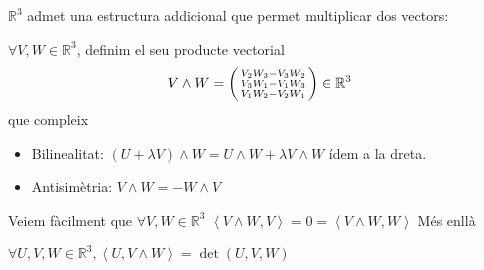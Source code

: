 \documentclass[../main.tex]{subfiles}
\begin{document}
$\mathbb{R}^3$ admet una estructura addicional que permet multiplicar dos vectors:
\begin{definicio}
    $\forall V, W \in \mathbb{R}^3$, definim el seu producte vectorial
    \begin{displaymath}
        V\wedge W = \begin{psmallmatrix}
        V_2W_3-V_3W_2\\
        V_3W_1-V_1W_3\\
        V_1W_2-V_2W_1
        \end{psmallmatrix} \in \mathbb{R}^3
    \end{displaymath}
    que compleix
    \begin{itemize}
        \item Bilinealitat: $(U + \lambda V) \wedge W = U\wedge W + \lambda V\wedge W$ ídem a la
        dreta.
        \item Antisimètria: $V\wedge W = -W \wedge V$
    \end{itemize}
\end{definicio}
Veiem fàcilment que $\forall V, W \in \mathbb{R}^3$ $\left\langle V\wedge W, V\right\rangle = 0 = \left\langle V\wedge W, W\right\rangle$
Més enllà
\begin{proposition}
    $\forall U, V, W \in \mathbb{R}^3, \left\langle U, V\wedge W\right\rangle = \det{\left(U, V, W\right)}$
\end{proposition}
\end{document}
